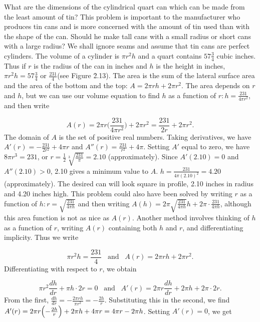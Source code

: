 \begin{example}
\label{exam 2.2.2}
What are the dimensions of the cylindrical quart can which can be made from the least amount of tin? This problem is important to the manufacturer who produces tin cans and is more concerned with the amount of tin used than with the shape of the can. Should he make tall cans with a small radius or short cans with a large radius? We shall ignore seams and assume that tin cans are perfect cylinders. The volume of a cylinder is $\pi {r^2}h$ and a quart contains $57\frac{3}{4}$ cubic inches. Thus if $r$ is the radius of the can in inches and $h$ is the height in inches, $\pi {r^2}h = 57 \frac{3}{4}$ or $\frac{231}{4}$(see Figure \f{2.13}). The area is the sum of the lateral surface area and the area of the bottom and the top: $A = 2\pi rh + 2\pi {r^2}$. The area depends on $r$ and $h$, but we can use our volume equation to find $h$ as a function of $r: h = \frac{231}{4\pi {r^2}}$, and then write


$$
A(r) = 2\pi r \bigl( \frac{231}{4\pi {r^2}} \bigr) + 2\pi r^2 = \frac{231}{2r} + 2\pi {r^2}.
$$
\noindent The domain of $A$ is the set of positive real numbers. Taking derivatives, we have $A'(r) = - \frac{231}{2r^2} + 4 \pi r$ and
$A''(r) = \frac{231}{r^2} + 4 \pi$. Setting $A'$ equal to zero, we have $8 \pi r^3 = 231$, or $r = \frac{1}{2} \sqrt[3]{\frac{231}{\pi}} = 2.10$ (approximately). Since $A'(2.10) = 0$ and $A''(2.10) > 0$, 2.10 gives a minimum value to $A$. $h = \frac{231}{4 \pi (2.10)^2} = 4.20$ (approximately). The desired can will look square in profile, 2.10 inches in radius and 4.20 inches high. This problem could also have been solved by writing $r$ as a function of $h: r = \sqrt{\frac{231}{4\pi h}}$ and then writing $A(h) = 2\pi \sqrt {\frac{231}{4\pi h}} h + 2\pi \cdot \frac{231}{4\pi h}$, although this area function is not as nice as $A(r)$. Another method involves thinking of $h$ as a function of $r$, writing $A(r)$ containing both $h$ and $r$, and differentiating implicity. Thus we write

$$
\pi {r^2}h = \frac{231}{4} \;\;\;\mbox{and} \;\;\; A(r) = 2 \pi rh + 2 \pi r^2. 
$$
Differentiating with respect to $r$, we obtain

$$
\pi r^2 \frac{dh}{dr} + \pi h \cdot 2r = 0 \;\;\; \mbox{and} \;\;\; A'(r) = 
2 \pi r \frac{dh}{dr} + 2\pi h + 2 \pi \cdot 2r.
$$
\noindent From the first, $\frac{dh}{dr} = -\frac{2 \pi rh}{\pi r^2} = -\frac{2h}{r}$. Substituting this in the second, we find $A'(r) = 2 \pi r \Bigl( -\frac{2h}{r} \Bigr) + 2 \pi h + 4 \pi r = 4 \pi r - 2\pi h$. Setting $A'(r) = 0$, we get  


\end{example}
